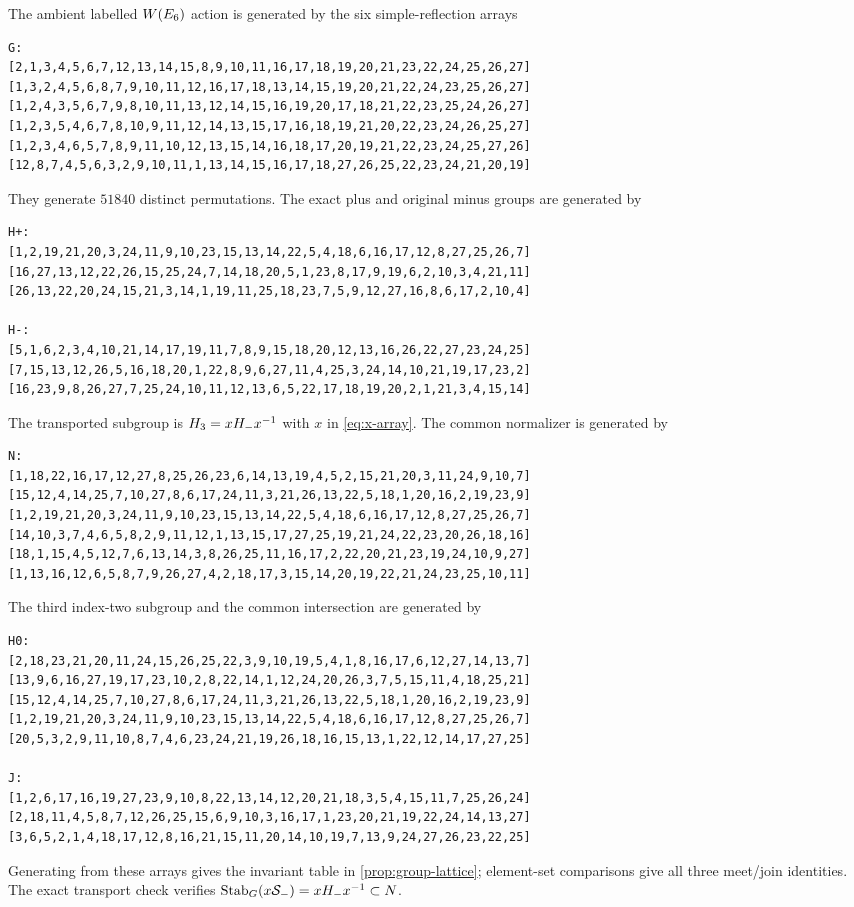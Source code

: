 The ambient labelled $W(E_6)$ action is generated by the six simple-reflection
arrays
\begingroup\scriptsize
\begin{verbatim}
G:
[2,1,3,4,5,6,7,12,13,14,15,8,9,10,11,16,17,18,19,20,21,23,22,24,25,26,27]
[1,3,2,4,5,6,8,7,9,10,11,12,16,17,18,13,14,15,19,20,21,22,24,23,25,26,27]
[1,2,4,3,5,6,7,9,8,10,11,13,12,14,15,16,19,20,17,18,21,22,23,25,24,26,27]
[1,2,3,5,4,6,7,8,10,9,11,12,14,13,15,17,16,18,19,21,20,22,23,24,26,25,27]
[1,2,3,4,6,5,7,8,9,11,10,12,13,15,14,16,18,17,20,19,21,22,23,24,25,27,26]
[12,8,7,4,5,6,3,2,9,10,11,1,13,14,15,16,17,18,27,26,25,22,23,24,21,20,19]
\end{verbatim}
\endgroup
They generate $51840$ distinct permutations.  The exact plus and original minus groups are generated by
\begingroup\scriptsize
\begin{verbatim}
H+:
[1,2,19,21,20,3,24,11,9,10,23,15,13,14,22,5,4,18,6,16,17,12,8,27,25,26,7]
[16,27,13,12,22,26,15,25,24,7,14,18,20,5,1,23,8,17,9,19,6,2,10,3,4,21,11]
[26,13,22,20,24,15,21,3,14,1,19,11,25,18,23,7,5,9,12,27,16,8,6,17,2,10,4]

H-:
[5,1,6,2,3,4,10,21,14,17,19,11,7,8,9,15,18,20,12,13,16,26,22,27,23,24,25]
[7,15,13,12,26,5,16,18,20,1,22,8,9,6,27,11,4,25,3,24,14,10,21,19,17,23,2]
[16,23,9,8,26,27,7,25,24,10,11,12,13,6,5,22,17,18,19,20,2,1,21,3,4,15,14]
\end{verbatim}
\endgroup
The transported subgroup is $H_{3}=xH_{-} x^{-1}$ with $x$ in
\eqref{eq:x-array}.  The common normalizer is generated by
\begingroup\scriptsize
\begin{verbatim}
N:
[1,18,22,16,17,12,27,8,25,26,23,6,14,13,19,4,5,2,15,21,20,3,11,24,9,10,7]
[15,12,4,14,25,7,10,27,8,6,17,24,11,3,21,26,13,22,5,18,1,20,16,2,19,23,9]
[1,2,19,21,20,3,24,11,9,10,23,15,13,14,22,5,4,18,6,16,17,12,8,27,25,26,7]
[14,10,3,7,4,6,5,8,2,9,11,12,1,13,15,17,27,25,19,21,24,22,23,20,26,18,16]
[18,1,15,4,5,12,7,6,13,14,3,8,26,25,11,16,17,2,22,20,21,23,19,24,10,9,27]
[1,13,16,12,6,5,8,7,9,26,27,4,2,18,17,3,15,14,20,19,22,21,24,23,25,10,11]
\end{verbatim}
\endgroup
The third index-two subgroup and the common intersection are generated by
\begingroup\scriptsize
\begin{verbatim}
H0:
[2,18,23,21,20,11,24,15,26,25,22,3,9,10,19,5,4,1,8,16,17,6,12,27,14,13,7]
[13,9,6,16,27,19,17,23,10,2,8,22,14,1,12,24,20,26,3,7,5,15,11,4,18,25,21]
[15,12,4,14,25,7,10,27,8,6,17,24,11,3,21,26,13,22,5,18,1,20,16,2,19,23,9]
[1,2,19,21,20,3,24,11,9,10,23,15,13,14,22,5,4,18,6,16,17,12,8,27,25,26,7]
[20,5,3,2,9,11,10,8,7,4,6,23,24,21,19,26,18,16,15,13,1,22,12,14,17,27,25]

J:
[1,2,6,17,16,19,27,23,9,10,8,22,13,14,12,20,21,18,3,5,4,15,11,7,25,26,24]
[2,18,11,4,5,8,7,12,26,25,15,6,9,10,3,16,17,1,23,20,21,19,22,24,14,13,27]
[3,6,5,2,1,4,18,17,12,8,16,21,15,11,20,14,10,19,7,13,9,24,27,26,23,22,25]
\end{verbatim}
\endgroup
Generating from these arrays gives the invariant table in
\cref{prop:group-lattice}; element-set comparisons give all three meet/join
identities.  The exact transport check verifies
$\operatorname{Stab}_G(x\mathcal{S}_-)=xH_{-} x^{-1}\subset N$.

